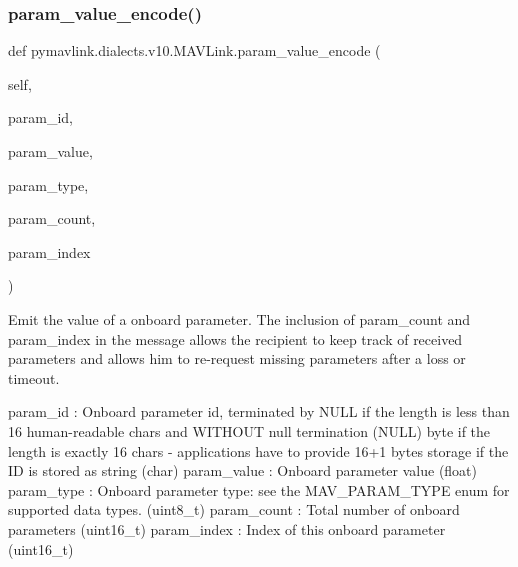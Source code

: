 \begin{DoxyVerb}
\begin{DoxyVerb}
\begin{DoxyVerb}
\begin{DoxyVerb}
\subsubsection{\texorpdfstring{param\+\_\+value\+\_\+encode()}{param\_value\_encode()}}
{\footnotesize\ttfamily def pymavlink.\+dialects.\+v10.\+M\+A\+V\+Link.\+param\+\_\+value\+\_\+encode (\begin{DoxyParamCaption}\item[{}]{self,  }\item[{}]{param\+\_\+id,  }\item[{}]{param\+\_\+value,  }\item[{}]{param\+\_\+type,  }\item[{}]{param\+\_\+count,  }\item[{}]{param\+\_\+index }\end{DoxyParamCaption})}

\begin{DoxyVerb}Emit the value of a onboard parameter. The inclusion of param_count
and param_index in the message allows the recipient to
keep track of received parameters and allows him to
re-request missing parameters after a loss or timeout.

param_id                  : Onboard parameter id, terminated by NULL if the length is less than 16 human-readable chars and WITHOUT null termination (NULL) byte if the length is exactly 16 chars - applications have to provide 16+1 bytes storage if the ID is stored as string (char)
param_value               : Onboard parameter value (float)
param_type                : Onboard parameter type: see the MAV_PARAM_TYPE enum for supported data types. (uint8_t)
param_count               : Total number of onboard parameters (uint16_t)
param_index               : Index of this onboard parameter (uint16_t)\end{DoxyVerb}
 \mbox{\label{classpymavlink_1_1dialects_1_1v10_1_1MAVLink_ae8b8d1ad6232b25a83ce39930b54f4a5}} 

\end{DoxyVerb}
\end{DoxyVerb}
\end{DoxyVerb}
\end{DoxyVerb}
